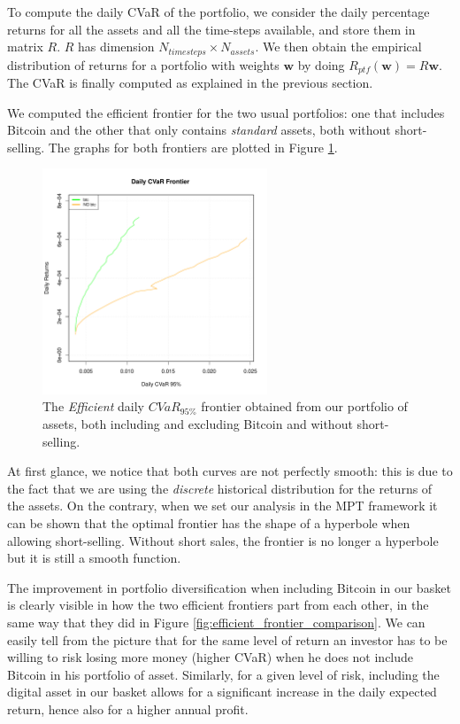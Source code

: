 To compute the daily CVaR of the portfolio, we consider the daily percentage returns for all the assets and all the time-steps available, and store them in matrix $R$. $R$ has dimension $N_{timesteps} \times N_{assets}$. We then obtain the empirical distribution of returns for a portfolio with weights $\mathbf{w}$ by doing $R_{ptf}(\mathbf{w}) = R \mathbf{w} $. The CVaR is finally computed as explained in the previous section.

We computed the efficient frontier for the two usual portfolios: one that includes Bitcoin and the other that only contains \textit{standard} assets, both without short-selling. The graphs for both frontiers are plotted in Figure \ref{fig:cvar_efficient_frontier_comparison}.


\begin{figure}
	\centering
	\includegraphics[width=0.6\textwidth]{Images/efficient_frontier_CVaR.pdf}
	\caption[Efficient CVaR frontier comparison]{The \textit{Efficient} daily $CVaR_{95\%}$ frontier obtained from our portfolio of assets, both including and excluding Bitcoin and without short-selling.}
	\label{fig:cvar_efficient_frontier_comparison}
\end{figure}


At first glance, we notice that both curves are not perfectly smooth: this is due to the fact that we are using the \textit{discrete} historical distribution for the returns of the assets. On the contrary, when we set our analysis in the MPT framework it can be shown that the optimal frontier has the shape of a hyperbole when allowing short-selling. Without short sales, the frontier is no longer a hyperbole but it is still a smooth function.

The improvement in portfolio diversification when including Bitcoin in our basket is clearly visible in how the two efficient frontiers part from each other, in the same way that they did in Figure \ref{fig:efficient_frontier_comparison}.
We can easily tell from the picture that for the same level of return an investor has to be willing to risk losing more money (higher CVaR) when he does not include Bitcoin in his portfolio of asset.
Similarly, for a given level of risk, including the digital asset in our basket allows for a significant increase in the daily expected return,  hence also for a higher annual profit.

